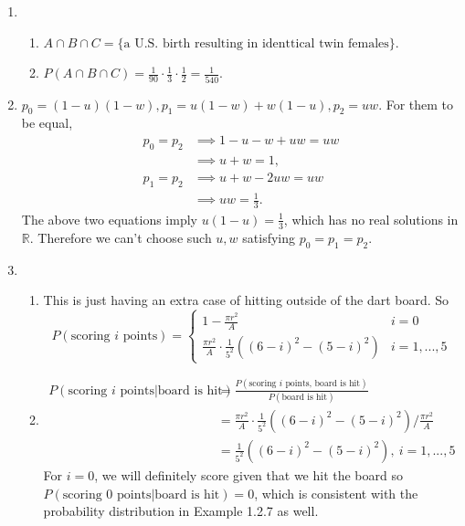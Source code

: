 \documentclass{article}
\begin{document}
\begin{enumerate}
    \item \begin{enumerate}
        \item $A \cap B \cap C = \{ \text{a U.S. birth resulting in identtical twin females} \}$.
        \item $P(A \cap B \cap C) = \frac{1}{90} \cdot \frac{1}{3} \cdot \frac{1}{2} 
        = \frac{1}{540}$.
    \end{enumerate}

    \item $p_0 = (1 - u)(1 - w), p_1 = u(1 - w) + w(1 - u), p_2 = uw$. For them to be equal, 
    \begin{align*}
        p_0 = p_2 
        &\implies 1 - u - w + uw = uw \\
        &\implies u + w = 1, \\
        p_1 = p_2
        &\implies u + w - 2uw = uw \\
        &\implies uw = \frac{1}{3}.
    \end{align*}
    The above two equations imply $u(1 - u) = \frac{1}{3}$, which has no real solutions in 
    $\mathbb{R}$. Therefore we can't choose such $u, w$ satisfying $p_0 = p_1 = p_2$.
    \item \begin{enumerate}
        \item This is just having an extra case of hitting outside of the dart board. So 
        \[ P(\text{scoring } i \text{ points}) = \begin{cases}
            1 - \frac{\pi r^2}{A} & i = 0 \\
            \frac{\pi r^2}{A} \cdot \frac{1}{5^2} ((6 - i)^2 - (5 - i)^2) & i = 1, ..., 5
        \end{cases} \]

        \item \begin{align*}
            P(\text{scoring } i \text{ points}|\text{board is hit})
            &= \frac{P(\text{scoring } i \text{ points, board is hit})}
            {P(\text{board is hit})} \\
            &= \frac{\pi r^2}{A} \cdot \frac{1}{5^2} ((6 - i)^2 - (5 - i)^2) 
            / \frac{\pi r^2}{A} \\
            &= \frac{1}{5^2} ((6 - i)^2 - (5 - i)^2), \ i = 1, ..., 5
        \end{align*}
        For $i = 0$, we will definitely score given that we hit the board so \\
        $P(\text{scoring 0 points} | \text{board is hit}) = 0$, which is consistent with the 
        probability distribution in Example 1.2.7 as well.
    \end{enumerate}


\end{enumerate}
\end{document}
